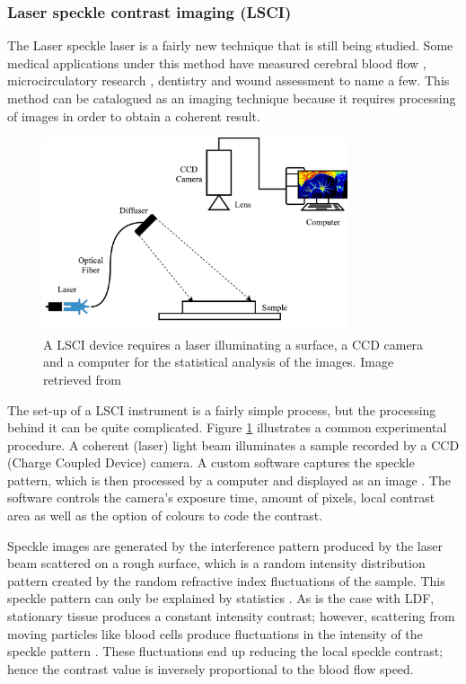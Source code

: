 \subsubsection{Laser speckle contrast imaging (LSCI)}
\label{section literature LSC}
The Laser speckle laser is a fairly new technique that is still being studied. Some medical applications under this method have measured cerebral blood flow \cite{dunn2001dynamic}, microcirculatory research \cite{domoki2012evaluation}, dentistry \cite{stoianovici2011assessment} and wound assessment \cite{stewart2005comparison} to name a few. This method can be catalogued as an imaging technique because it requires processing of images in order to obtain a coherent result. 

\begin{figure}[!htpb]
	\centering
	\includegraphics[width=0.8\textwidth,keepaspectratio]{lsci}    
	\caption[Setup of a Laser speckle contrast imaging]{A LSCI device requires a laser illuminating a surface, a CCD camera and a computer for the statistical analysis of the images. Image retrieved from \cite{son2013contrast}}
	\label{fig:LSCI}
\end{figure}


The set-up of a LSCI instrument is a fairly simple process, but the processing behind it can be quite complicated. Figure \ref{fig:LSCI} illustrates a common experimental procedure. A coherent (laser) light beam illuminates a sample recorded by a CCD (Charge Coupled Device) camera. A custom software captures the speckle pattern, which is then processed by a computer and displayed as an image \cite{jayanthy2011measuring, son2013contrast, duncan2008can}. The software controls the camera's exposure time, amount of pixels, local contrast area as well as the option of colours to code the contrast. 

Speckle images are generated by the interference pattern produced by the laser beam scattered on a rough surface, which is a random intensity distribution pattern created by the random refractive index fluctuations of the sample. This speckle pattern can only be explained by statistics \cite{goodman1975statistical}. As is the case with LDF, stationary tissue produces a constant intensity contrast; however, scattering from moving particles like blood cells produce fluctuations in the intensity of the speckle pattern \cite{son2013contrast}. These fluctuations end up reducing the local speckle contrast; hence the contrast value is inversely proportional to the blood flow speed. 


